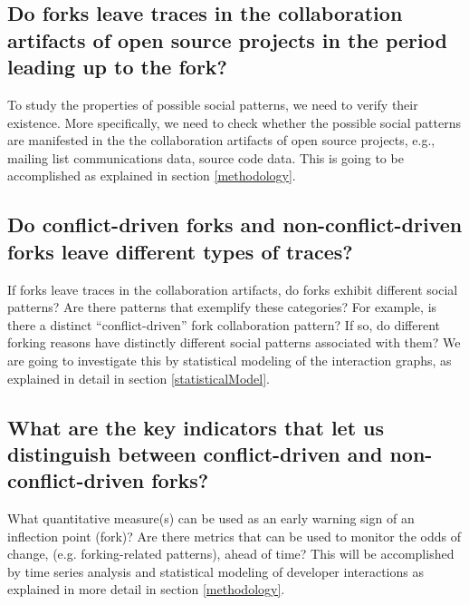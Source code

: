 \documentclass[12pt,letterpaper]{gthesis2}  %
\begin{document}
\subsection*{\hspace{4 mm} Do forks leave traces in the collaboration artifacts of open source projects in the period leading up to the fork?\\}

To study the properties of possible social patterns, we need to verify their existence. More specifically, we need to check whether the possible social patterns are manifested in the the collaboration artifacts of open source projects, e.g., mailing list communications data, source code data. This is going to be accomplished as explained in section \ref{methodology}.

\subsection*{\hspace{4 mm} Do conflict-driven forks and non-conflict-driven forks leave different types of traces?\\}

If forks leave traces in the collaboration artifacts, do forks exhibit different social patterns? Are there patterns that exemplify these categories? For example, is there a distinct ``conflict-driven'' fork collaboration pattern? If so, do different forking reasons have distinctly different social patterns associated with them? We are going to investigate this by statistical modeling of the interaction graphs, as explained in detail in section \ref{statisticalModel}.

\subsection*{\hspace{4 mm} What are the key indicators that let us distinguish between conflict-driven and non-conflict-driven forks?\\}

What quantitative measure(s) can be used as an early warning sign of an inflection point (fork)? Are there metrics that can be used to monitor the odds of change, (e.g. forking-related patterns), ahead of time? This will be accomplished by time series analysis and statistical modeling of developer interactions as explained in more detail in section \ref{methodology}.\\
\end{document}
